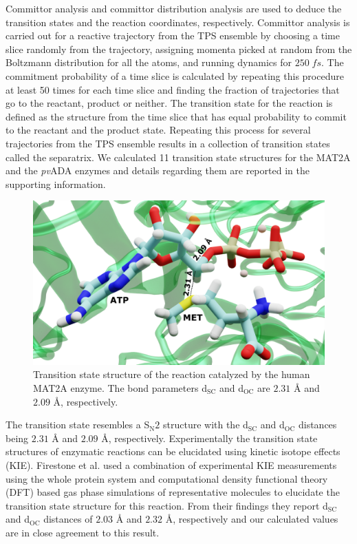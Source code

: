 \documentclass[journal=jpcbfk,manuscript=article,layout=traditional]{achemso}
\begin{document}
Committor analysis and committor distribution analysis are used to deduce 
the transition states and the reaction coordinates, respectively. 
Committor analysis is carried out for a reactive trajectory 
from the TPS ensemble by choosing a time slice randomly from the trajectory, assigning
momenta picked at random from the Boltzmann distribution for all the atoms, and running 
dynamics for $250\;fs$. The commitment probability of a time slice is calculated by 
repeating this procedure at least 50 times for each time slice and finding the fraction of trajectories that go 
to the reactant, product or neither. The transition state for the reaction is defined as 
the structure from the time slice that has equal probability to commit to the reactant 
and the product state. Repeating this process for several trajectories from the TPS
ensemble results in a collection of transition states called the separatrix. We calculated 
11 transition state structures for the MAT2A and the \textit{pv}ADA enzymes and details 
regarding them are reported in the supporting information. 
\begin{figure}[ht!]
\includegraphics[scale=0.12]{figures/mat2a-trans-labelled.png}
\caption{Transition state structure of the reaction catalyzed by the human MAT2A enzyme.
The bond parameters d$_{\text{SC}}$ and d$_{\text{OC}}$ are $2.31$ {\AA} and $2.09$ {\AA}, 
respectively.}
\label{fig:mat2a-trans-struct}
\end{figure}
The transition state resembles a S$_{\text{N}}2$ structure with the 
d$_{\text{SC}}$ and d$_{\text{OC}}$ distances being $2.31$ {\AA} and $2.09$ {\AA}, respectively.
Experimentally the transition state structures of enzymatic reactions
can be elucidated using kinetic isotope effects (KIE). \cite{Schramm99MetEnzym308p301}
Firestone et al. \cite{Firestone17JAmChemSoc139p13754} used a combination of experimental 
KIE measurements using the whole protein system and computational density functional 
theory (DFT) based gas phase simulations of representative molecules to elucidate the 
transition state structure for this reaction. From their findings they report 
d$_{\text{SC}}$ and d$_{\text{OC}}$ distances of $2.03$ {\AA} and $2.32$ {\AA}, 
respectively and our calculated values are in close agreement to this result. 
\end{document}
